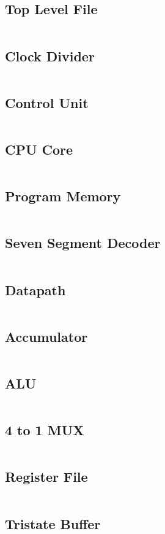 \documentclass[12pt]{article}
\begin{document}
\subsection{Top Level File}
\inputminted{vhdl}{../src/Lab3_top.vhd}

\pagebreak
\subsection{Clock Divider}
\inputminted{vhdl}{../src/ClockDivider.vhd}

\pagebreak
\subsection{Control Unit}
\inputminted{vhdl}{../src/ControlUnit.vhd}

\pagebreak
\subsection{CPU Core}
\inputminted{vhdl}{../src/CpuCore.vhd}

\pagebreak
\subsection{Program Memory}
\inputminted{vhdl}{../src/ProgMem.vhd}

\pagebreak
\subsection{Seven Segment Decoder}
\inputminted{vhdl}{../src/SevenSgementDecoder.vhd}

\pagebreak
\subsection{Datapath}
\inputminted{vhdl}{../src/datapath/Datapath.vhd}

\pagebreak
\subsection{Accumulator}
\inputminted{vhdl}{../src/datapath/Accumulator.vhd}

\pagebreak
\subsection{ALU}
\inputminted{vhdl}{../src/datapath/ALU.vhd}

\pagebreak
\subsection{4 to 1 MUX}
\inputminted{vhdl}{../src/datapath/MUX4.vhd}

\pagebreak
\subsection{Register File}
\inputminted{vhdl}{../src/datapath/RegisterFile.vhd}

\pagebreak
\subsection{Tristate Buffer}
\inputminted{vhdl}{../src/datapath/TristateBuffer.vhd}
\end{document}
